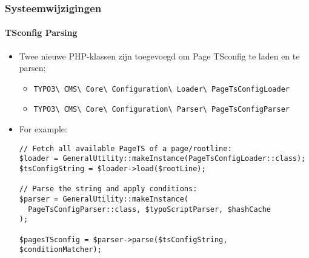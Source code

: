 
\begin{frame}[fragile]
	\frametitle{Systeemwijzigingen}
	\framesubtitle{TSconfig Parsing}

	\lstset{basicstyle=\tiny\ttfamily}

	\begin{itemize}
		\item Twee nieuwe PHP-klassen zijn toegevoegd om Page TSconfig te laden en te parsen:
			\begin{itemize}\smaller
				\item \texttt{TYPO3\textbackslash
					CMS\textbackslash
					Core\textbackslash
					Configuration\textbackslash
					Loader\textbackslash
					PageTsConfigLoader}
				\item \texttt{TYPO3\textbackslash
					CMS\textbackslash
					Core\textbackslash
					Configuration\textbackslash
					Parser\textbackslash
					PageTsConfigParser}
			\end{itemize}

		\item For example:
\begin{lstlisting}
// Fetch all available PageTS of a page/rootline:
$loader = GeneralUtility::makeInstance(PageTsConfigLoader::class);
$tsConfigString = $loader->load($rootLine);

// Parse the string and apply conditions:
$parser = GeneralUtility::makeInstance(
  PageTsConfigParser::class, $typoScriptParser, $hashCache
);

$pagesTSconfig = $parser->parse($tsConfigString, $conditionMatcher);
\end{lstlisting}

	\end{itemize}

\end{frame}


